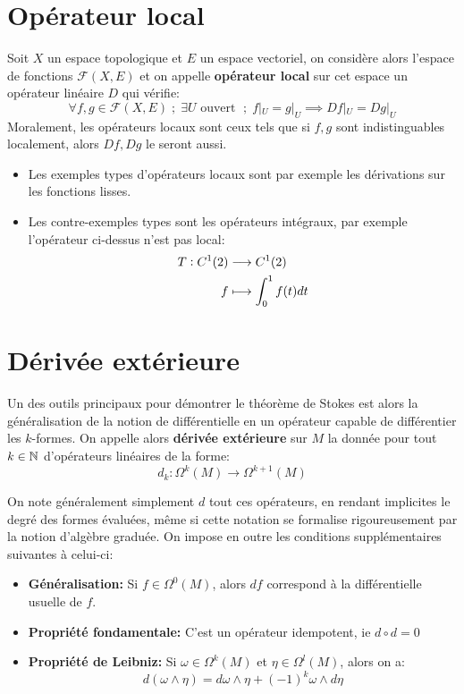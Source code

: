    \section{Opérateur local}
      Soit \( X \) un espace topologique et \( E \) un espace vectoriel, on considère alors l'espace de fonctions \(\mathcal{F}(X, E)\) et on appelle \textbf{opérateur local} sur cet espace un opérateur linéaire \(D\) qui vérifie:
      \[ 
         \forall f, g \in \mathcal{F}(X, E) \; ; \;  \exists U \text{ ouvert } \; ; \; f|_U = g|_U \implies Df|_U = Dg|_U 
      \]
      Moralement, les opérateurs locaux sont ceux tels que si \( f, g \) sont indistinguables localement, alors \( Df, Dg \) le seront aussi.
      \begin{itemize}
         \item Les exemples types d'opérateurs locaux sont par exemple les dérivations sur les fonctions lisses.
         \item Les contre-exemples types sont les opérateurs intégraux, par exemple l'opérateur ci-dessus n'est pas local:
         \[ 
            \begin{aligned}
               T : C^1(2) &\longrightarrow C^1(2) \\
               f &\longmapsto \int_0^1 f(t)dt 
            \end{aligned} 
         \]
      \end{itemize}
   \section{Dérivée extérieure}
      Un des outils principaux pour démontrer le théorème de Stokes est alors la généralisation de la notion de différentielle en un opérateur capable de différentier les \( k \)-formes. On appelle alors \textbf{dérivée extérieure} sur \( M \) la donnée pour tout \( k \in \mathbb{N} \) d'opérateurs linéaires de la forme:
      \[ 
         d_k : \Omega^k(M) \longrightarrow \Omega^{k+1}(M) 
      \]
      
      On note généralement simplement \( d \) tout ces opérateurs, en rendant implicites le degré des formes évaluées, même si cette notation se formalise rigoureusement par la notion d'algèbre graduée. On impose en outre les conditions supplémentaires suivantes à celui-ci:
      \begin{itemize}
         \item \textbf{Généralisation:} Si \( f \in \Omega^0(M)\), alors \( df \) correspond à la différentielle usuelle de \( f \).
         \item \textbf{Propriété fondamentale:} C'est un opérateur idempotent, ie \(d \circ d = 0\)
         \item \textbf{Propriété de Leibniz:} Si \( \omega \in \Omega^k(M) \) et \( \eta \in \Omega^l(M) \), alors on a:
         \[ 
            d(\omega \wedge \eta) = d\omega \wedge \eta + (-1)^k\omega \wedge d\eta 
         \]
      \end{itemize}
   
